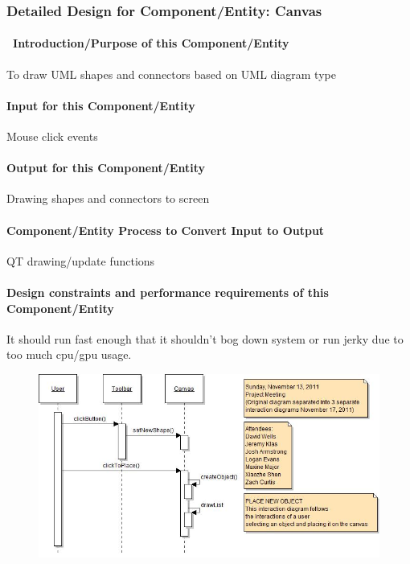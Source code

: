 \documentclass[twoside,letterpaper]{article}
\begin{document}
{\bigskip


\subsubsection{Detailed Design for Component/Entity: Canvas}

\paragraph[\ Introduction/Purpose of this
Component/Entity]{\ Introduction/Purpose of this Component/Entity}
{\color{black}
To draw UML shapes and connectors based on UML diagram type}

\paragraph{Input for this Component/Entity}
{\color{black}
Mouse click events}

\paragraph{Output for this Component/Entity}
{\color{black}
Drawing shapes and connectors to screen}

\paragraph{Component/Entity Process to Convert Input to Output}
{\color{black}
QT drawing/update functions}

\paragraph{Design constraints and performance requirements of this
Component/Entity}
{\color{black}
It should run fast enough that it shouldn't bog down system or run
jerky due to too much cpu/gpu usage.
}

\begin{figure}
\centering
\includegraphics[width=5.0in]{2011-11-17_IntNewObj.jpg}
\end{figure}

}
\end{document}
